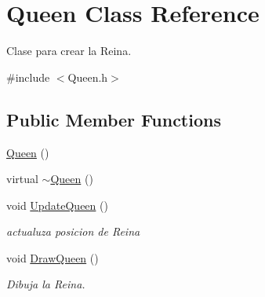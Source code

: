 \hypertarget{class_queen}{}\section{Queen Class Reference}
\label{class_queen}


Clase para crear la Reina.  




{\ttfamily \#include $<$Queen.\+h$>$}

\subsection*{Public Member Functions}
\begin{DoxyCompactItemize}
\item 
\hyperlink{class_queen_ae2314f4890c7fa7d5da670b3c0b6293b}{Queen} ()
\item 
virtual \hyperlink{class_queen_a0f8d99c83546d2e6a6d4232c6ad9bdb2}{$\sim$\+Queen} ()
\item 
void \hyperlink{class_queen_a203ca68e74de0eab8e4781e3d8b3edc7}{Update\+Queen} ()
\begin{DoxyCompactList}\small\item\em actualuza posicion de Reina \end{DoxyCompactList}\item 
void \hyperlink{class_queen_a483a180627781a1465c981f4caf0a2c6}{Draw\+Queen} ()
\begin{DoxyCompactList}\small\item\em Dibuja la Reina. \end{DoxyCompactList}\end{DoxyCompactItemize}

